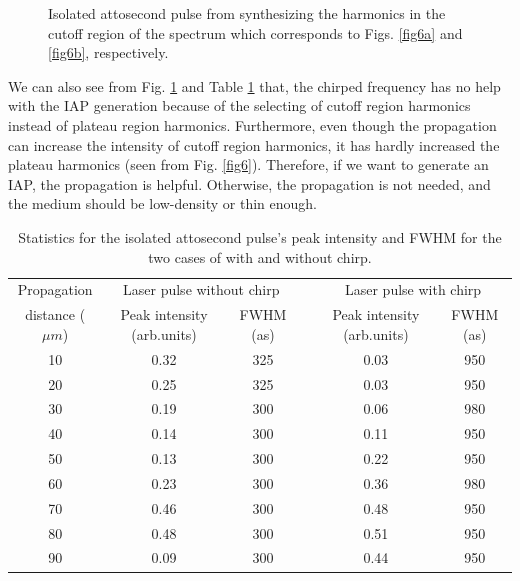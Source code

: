 \documentclass[10pt,letterpaper]{article}
\begin{document}
\begin{figure}[!htbp]
	\centering
	\hspace{-0.2in}
	\caption{Isolated attosecond pulse from synthesizing the harmonics in the cutoff region of the spectrum which corresponds to Figs. \ref{fig6a} and \ref{fig6b}, respectively.}
	\label{fig7}
\end{figure}

We can also see from Fig. \ref{fig7} and Table \ref{table1} that, the chirped frequency has no help with the IAP generation because of the selecting of cutoff region harmonics instead of plateau region harmonics. Furthermore, even though the propagation can increase the intensity of cutoff region harmonics, it has hardly increased the plateau harmonics (seen from Fig. \ref{fig6}). Therefore, if we want to generate an IAP, the propagation is helpful. Otherwise, the propagation is not needed, and the medium should be low-density or thin enough.

\begin{table}[!htbp]
	\centering
	\caption{Statistics for the isolated attosecond pulse's peak intensity and FWHM for the two cases of with and without chirp.}
\begin{tabular}{cccccc}
	\hline
	Propagation & \multicolumn{2}{c}{Laser pulse without chirp} &  & \multicolumn{2}{c}{Laser pulse with chirp}\tabularnewline
	\cline{2-3} \cline{5-6}
	distance ($\mu m$) & Peak intensity (arb.units) & FWHM (as) &  & Peak intensity (arb.units) & FWHM (as)\tabularnewline
	\hline
	10 & 0.32 & 325 && 0.03 & 950\tabularnewline
	20 & 0.25 & 325 && 0.03 & 950\tabularnewline
	30 & 0.19 & 300 && 0.06 & 980\tabularnewline
	40 & 0.14 & 300 && 0.11 & 950\tabularnewline
	50 & 0.13 & 300 && 0.22 & 950\tabularnewline
	60 & 0.23 & 300 && 0.36 & 980\tabularnewline
	70 & 0.46 & 300 && 0.48 & 950\tabularnewline
	80 & 0.48 & 300 && 0.51 & 950\tabularnewline
	90 & 0.09 & 300 && 0.44 & 950\tabularnewline
	\hline
\end{tabular}
	\label{table1}

\end{table}
\end{document}
